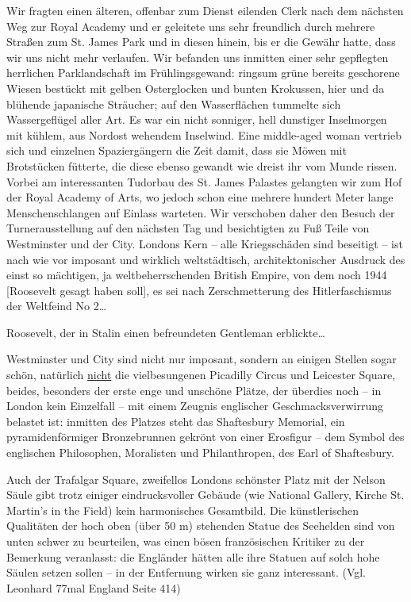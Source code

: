 \documentclass[a5paper,pagesize,10pt,twoside=true]{scrbook}
\renewcommand{\marginpar}[2][]{}
\begin{document}
Wir fragten einen älteren, offenbar zum Dienst eilenden Clerk nach dem nächsten Weg zur Royal Academy und er geleitete uns sehr freundlich durch mehrere Straßen zum St. James Park und in diesen hinein, bis er die Gewähr hatte, dass wir uns nicht mehr verlaufen. Wir befanden uns inmitten einer sehr gepflegten herrlichen Parklandschaft im Frühlingsgewand: ringsum grüne bereits geschorene Wiesen bestückt mit gelben Osterglocken und bunten Krokussen, hier und da blühende japanische Sträucher; auf den Wasserflächen tummelte sich Wassergeflügel aller Art. Es war ein nicht sonniger, hell dunstiger Inselmorgen mit kühlem, aus Nordost wehendem Inselwind. Eine middle-aged woman vertrieb sich und einzelnen Spaziergängern die Zeit damit, dass sie Möwen mit Brotstücken fütterte, die diese ebenso gewandt wie dreist ihr vom Munde \marginpar{579} rissen. Vorbei am interessanten Tudorbau des St. James Palastes gelangten wir zum Hof der Royal Academy of Arts, wo jedoch schon eine mehrere hundert Meter lange Menschenschlangen auf Einlass warteten. Wir verschoben daher den Besuch der Turnerausstellung auf den nächsten Tag und besichtigten zu Fuß Teile von Westminster und der City. Londons Kern -- alle Kriegsschäden sind beseitigt -- ist nach wie vor imposant und wirklich weltstädtisch, architektonischer Ausdruck des einst so mächtigen, ja weltbeherrschenden British Empire, von dem noch 1944 [Roosevelt gesagt haben soll], es sei nach Zerschmetterung des Hitlerfaschismus der Weltfeind No 2\dots 

Roosevelt, der in Stalin einen befreundeten Gentleman erblickte\dots

Westminster und City sind nicht nur imposant, sondern an einigen Stellen sogar schön, natürlich \underline{nicht} die vielbesungenen Picadilly Circus und Leicester Square, beides, besonders der erste enge und unschöne Plätze, der überdies noch -- in London kein Einzelfall -- mit einem Zeugnis englischer Geschmacksverwirrung belastet ist: inmitten des Platzes steht das Shaftesbury Memorial, ein pyramidenförmiger Bronzebrunnen gekrönt von einer Erosfigur -- dem Symbol des englischen Philosophen, Moralisten und Philanthropen, des Earl of Shaftesbury.

Auch der Trafalgar Square, zweifellos Londons schönster Platz mit der Nelson Säule gibt trotz einiger eindrucksvoller Gebäude (wie National Gallery, Kirche St. Martin's in the Field) kein harmonisches Gesamtbild. Die künstlerischen Qualitäten der hoch oben (über 50 m) stehenden Statue des Seehelden sind von unten schwer zu beurteilen, was einen bösen französischen Kritiker zu der Bemerkung veranlasst: die Engländer hätten alle ihre Statuen auf solch hohe Säulen setzen sollen -- in der Entfernung wirken sie ganz interessant. (Vgl. Leonhard 77mal England Seite 414)
\end{document}
